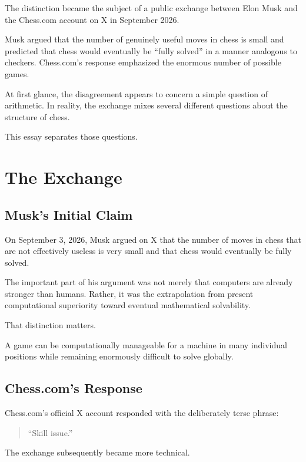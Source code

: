 \documentclass[12pt,a4paper]{article}
\begin{document}
The distinction became the subject of a public exchange between Elon
Musk and the Chess.com account on X in September 2026.

Musk argued that the number of genuinely useful moves in chess is
small and predicted that chess would eventually be ``fully solved''
in a manner analogous to checkers. Chess.com's response emphasized
the enormous number of possible games.

At first glance, the disagreement appears to concern a simple question
of arithmetic. In reality, the exchange mixes several different
questions about the structure of chess.

This essay separates those questions.


\section{The Exchange}

\subsection{Musk's Initial Claim}

On September 3, 2026, Musk argued on X that the number of moves in
chess that are not effectively useless is very small and that chess
would eventually be fully solved.

The important part of his argument was not merely that computers are
already stronger than humans. Rather, it was the extrapolation from
present computational superiority toward eventual mathematical
solvability.

That distinction matters.

A game can be computationally manageable for a machine in many
individual positions while remaining enormously difficult to solve
globally.


\subsection{Chess.com's Response}

Chess.com's official X account responded with the deliberately terse
phrase:

\begin{quote}
    ``Skill issue.''
\end{quote}

The exchange subsequently became more technical.
\end{document}
